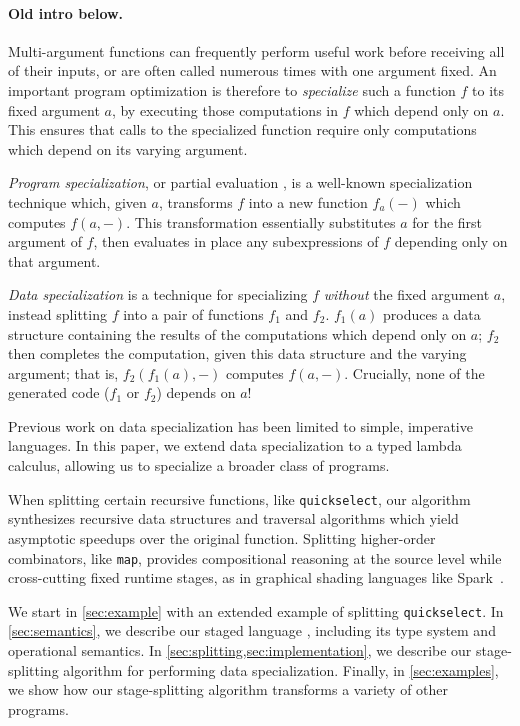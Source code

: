 \paragraph{Old intro below.}

Multi-argument functions can frequently perform useful work before receiving all
of their inputs, or are often called numerous times with one argument fixed. An
important program optimization is therefore to \emph{specialize} such a function
$f$ to its fixed argument $a$, by executing those computations in $f$ which
depend only on $a$. This ensures that calls to the specialized function require
only computations which depend on its varying argument.

\emph{Program specialization}, or partial evaluation \cite{futamura71,jones96},
is a well-known specialization technique which, given $a$, transforms $f$ into a
new function $f_a(-)$ which computes $f(a,-)$. This transformation essentially
substitutes $a$ for the first argument of $f$, then evaluates in place any
subexpressions of $f$ depending only on that argument.

\emph{Data specialization} \cite{knoblock96,JS86-staging} 
is a technique for specializing $f$ \emph{without} the fixed argument $a$,
instead splitting $f$ into a pair of functions $f_1$ and $f_2$. $f_1(a)$
produces a data structure containing the results of the computations which
depend only on $a$; $f_2$ then completes the computation, given this data
structure and the varying argument; that is, $f_2(f_1(a),-)$ computes $f(a,-)$.
Crucially, none of the generated code ($f_1$ or $f_2$) depends on $a$!

Previous work on data specialization has been limited to simple, imperative
languages. In this paper, we extend data specialization to a typed lambda
calculus, allowing us to specialize a broader class of programs.

When splitting certain recursive functions, like \texttt{quickselect}, our
algorithm synthesizes recursive data structures and traversal algorithms which
yield asymptotic speedups over the original function. Splitting higher-order
combinators, like \texttt{map}, provides compositional reasoning at the source
level while cross-cutting fixed runtime stages, as in graphical shading
languages like Spark~\cite{Foley:2011}.

We start in \ref{sec:example} with an extended example of splitting
\texttt{quickselect}.
In \ref{sec:semantics}, we describe our staged language \lang, including its
type system and operational semantics.
In \ref{sec:splitting,sec:implementation}, we describe our stage-splitting
algorithm for performing data specialization.
Finally, in \ref{sec:examples}, we show how our stage-splitting algorithm
transforms a variety of other programs.
